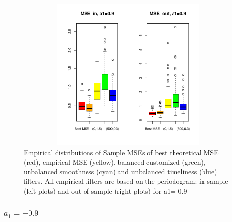 \documentclass[a4paper]{book}
\begin{document}
\begin{appendix}
\begin{figure}[H]\begin{center}\includegraphics[height=3in, width=6in]{z_box_plot_emp_per_perf_mse_inout_1}\caption{Empirical distributions
  of Sample MSEs of best theoretical MSE (red), empirical MSE (yellow), balanced customized (green),
  unbalanced smoothness (cyan) and unbalanced timeliness (blue) filters. All empirical filters are based on the periodogram:
  in-sample (left plots) and out-of-sample (right plots) for a1=-0.9\label{z_box_plot_emp_per_perf_mse_inout_1}}\end{center}\end{figure}

\subsubsection{$a_1=-0.9$}


\end{appendix}
\end{document}
